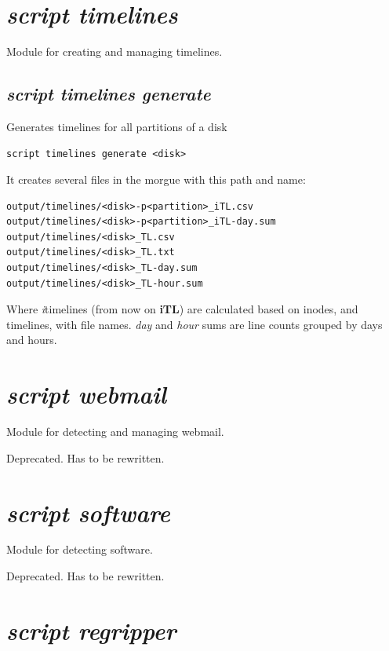 \documentclass[a4paper,11pt,oneside]{report}
\begin{document}
\section{\emph{script timelines}}

Module for creating and managing timelines.

\subsection{\emph{script timelines generate}} 

Generates timelines for all partitions of a disk

\begin{verbatim}
script timelines generate <disk>
\end{verbatim}

It creates several files in the morgue with this path and name:

\begin{verbatim}
output/timelines/<disk>-p<partition>_iTL.csv
output/timelines/<disk>-p<partition>_iTL-day.sum
output/timelines/<disk>_TL.csv
output/timelines/<disk>_TL.txt
output/timelines/<disk>_TL-day.sum
output/timelines/<disk>_TL-hour.sum
\end{verbatim}

Where \emph{i}timelines (from now on \textbf{iTL}) are calculated based on inodes, and timelines, with file names. \emph{day} and \emph{hour} sums are line counts grouped by days and hours.




\section{\emph{script webmail}}

Module for detecting and managing webmail.

Deprecated. Has to be rewritten.


\section{\emph{script software}}

Module for detecting software.

Deprecated. Has to be rewritten.


\section{\emph{script regripper}}
\end{document}
